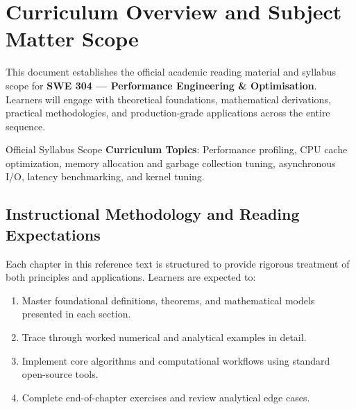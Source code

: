 \section{Curriculum Overview and Subject Matter Scope}

This document establishes the official academic reading material and syllabus scope for \textbf{SWE 304 --- Performance Engineering \& Optimisation}. Learners will engage with theoretical foundations, mathematical derivations, practical methodologies, and production-grade applications across the entire sequence.

\begin{InsightBox}{Official Syllabus Scope}
  \textbf{Curriculum Topics}: Performance profiling, CPU cache optimization, memory allocation and garbage collection tuning, asynchronous I/O, latency benchmarking, and kernel tuning.
\end{InsightBox}

\subsection{Instructional Methodology and Reading Expectations}

Each chapter in this reference text is structured to provide rigorous treatment of both principles and applications. Learners are expected to:
\begin{enumerate}
  \item Master foundational definitions, theorems, and mathematical models presented in each section.
  \item Trace through worked numerical and analytical examples in detail.
  \item Implement core algorithms and computational workflows using standard open-source tools.
  \item Complete end-of-chapter exercises and review analytical edge cases.
\end{enumerate}

